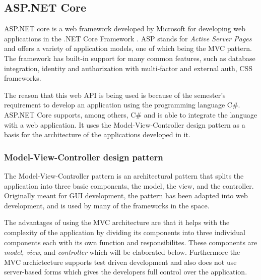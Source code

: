 \subsection{ASP.NET Core}

ASP.NET core is a web framework developed by Microsoft for developing web applications in the .NET Core Framework \cite{aspnetcore2}. ASP stands for \textit{Active Server Pages} and offers a variety of application models, one of which being the MVC pattern.
The framework has built-in support for many common features, such as database integration, identity and authorization with multi-factor and external auth, CSS frameworks.

The reason that this web API is being used is because of the semester's requirement to develop an application using the programming language C\#.
ASP.NET Core supports, among others, C\# and is able to integrate the language with a web application.
It uses the Model-View-Controller design pattern as a basis for the architecture of the applications developed in it.


\subsubsection{Model-View-Controller design pattern}
The Model-View-Controller pattern is an architectural pattern that splits the application into three basic components, the model, the view, and the controller. Originally meant for GUI development, the pattern has been adapted into web development, and is used by many of the frameworks in the space. \cite{gangoffour}

The advantages of using the MVC architecture are that it helps with the complexity of the application by dividing its components into three individual components each with its own function and responsibilites.
These components are \textit{model, view}, and \textit{controller} which will be elaborated below.
Furthermore the MVC archictecture supports test driven development and also does not use server-based forms which gives the developers full control over the application. \cite{mvcarticle}

